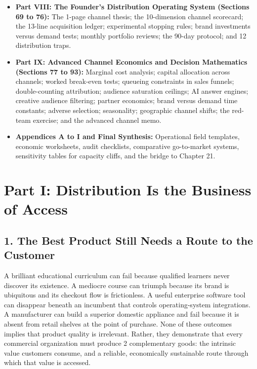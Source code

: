 \begin{itemize}[leftmargin=*,itemsep=1pt]
  \item \textbf{Part VIII: The Founder's Distribution Operating System (Sections 69 to 76):} The 1-page channel thesis; the 10-dimension channel scorecard; the 13-line acquisition ledger; experimental stopping rules; brand investments versus demand tests; monthly portfolio reviews; the 90-day protocol; and 12 distribution traps.
  \item \textbf{Part IX: Advanced Channel Economics and Decision Mathematics (Sections 77 to 93):} Marginal cost analysis; capital allocation across channels; worked break-even tests; queueing constraints in sales funnels; double-counting attribution; audience saturation ceilings; AI answer engines; creative audience filtering; partner economics; brand versus demand time constants; adverse selection; seasonality; geographic channel shifts; the red-team exercise; and the advanced channel memo.
  \item \textbf{Appendices A to I and Final Synthesis:} Operational field templates, economic worksheets, audit checklists, comparative go-to-market systems, sensitivity tables for capacity cliffs, and the bridge to Chapter 21.
\end{itemize}

\vspace{4pt}

\section*{Part I: Distribution Is the Business of Access}

\subsection*{1. The Best Product Still Needs a Route to the Customer}

A brilliant educational curriculum can fail because qualified learners never discover its existence. A mediocre course can triumph because its brand is ubiquitous and its checkout flow is frictionless. A useful enterprise software tool can disappear beneath an incumbent that controls operating-system integrations. A manufacturer can build a superior domestic appliance and fail because it is absent from retail shelves at the point of purchase. None of these outcomes implies that product quality is irrelevant. Rather, they demonstrate that every commercial organization must produce 2 complementary goods: the intrinsic value customers consume, and a reliable, economically sustainable route through which that value is accessed.

